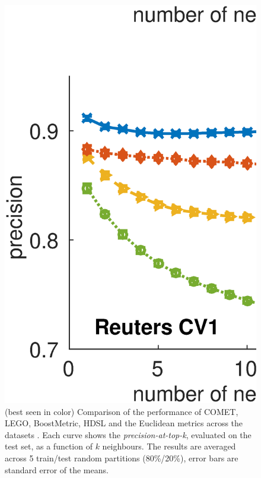 \documentclass{article}
\begin{document}
\begin{figure}[!h]
\vskip 0.2in
\begin{center}
\centerline{\includegraphics[width=\columnwidth]{Precision_at_K_all_datasets}}
\caption{ (best seen in color) Comparison of the performance of COMET, LEGO, BoostMetric, HDSL and the Euclidean metrics across the datasets . Each curve shows the \textit{precision-at-top-k}, evaluated on the test set, as a function of $k$ neighbours. The results are averaged across 5 train/test random partitions (80\%/20\%), error bars are standard error of the means.}
\label{precFig}
\end{center}
\vskip -0.2in
\end{figure} 
\end{document}
